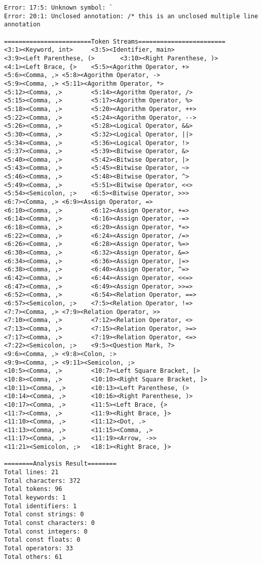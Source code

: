 \documentclass[lang=cn,11pt,a4paper]{paper}
\begin{document}
\begin{lstlisting}
Error: 17:5: Unknown symbol: `
Error: 20:1: Unclosed annotation: /* this is an unclosed multiple line annotation

========================Token Streams========================
<3:1><Keyword, int>     <3:5><Identifier, main>
<3:9><Left Parenthese, (>       <3:10><Right Parenthese, )>
<4:1><Left Brace, {>    <5:5><Agorithm Operator, +>
<5:6><Comma, ,> <5:8><Agorithm Operator, ->
<5:9><Comma, ,> <5:11><Agorithm Operator, *>
<5:12><Comma, ,>        <5:14><Agorithm Operator, />
<5:15><Comma, ,>        <5:17><Agorithm Operator, %>
<5:18><Comma, ,>        <5:20><Agorithm Operator, ++>
<5:22><Comma, ,>        <5:24><Agorithm Operator, -->
<5:26><Comma, ,>        <5:28><Logical Operator, &&>
<5:30><Comma, ,>        <5:32><Logical Operator, ||>
<5:34><Comma, ,>        <5:36><Logical Operator, !>
<5:37><Comma, ,>        <5:39><Bitwise Operator, &>
<5:40><Comma, ,>        <5:42><Bitwise Operator, |>
<5:43><Comma, ,>        <5:45><Bitwise Operator, ~>
<5:46><Comma, ,>        <5:48><Bitwise Operator, ^>
<5:49><Comma, ,>        <5:51><Bitwise Operator, <<>
<5:54><Semicolon, ;>    <6:5><Bitwise Operator, >>>
<6:7><Comma, ,> <6:9><Assign Operator, =>
<6:10><Comma, ,>        <6:12><Assign Operator, +=>
<6:14><Comma, ,>        <6:16><Assign Operator, -=>
<6:18><Comma, ,>        <6:20><Assign Operator, *=>
<6:22><Comma, ,>        <6:24><Assign Operator, /=>
<6:26><Comma, ,>        <6:28><Assign Operator, %=>
<6:30><Comma, ,>        <6:32><Assign Operator, &=>
<6:34><Comma, ,>        <6:36><Assign Operator, |=>
<6:38><Comma, ,>        <6:40><Assign Operator, ^=>
<6:42><Comma, ,>        <6:44><Assign Operator, <<=>
<6:47><Comma, ,>        <6:49><Assign Operator, >>=>
<6:52><Comma, ,>        <6:54><Relation Operator, ==>
<6:57><Semicolon, ;>    <7:5><Relation Operator, !=>
<7:7><Comma, ,> <7:9><Relation Operator, >>
<7:10><Comma, ,>        <7:12><Relation Operator, <>
<7:13><Comma, ,>        <7:15><Relation Operator, >=>
<7:17><Comma, ,>        <7:19><Relation Operator, <=>
<7:22><Semicolon, ;>    <9:5><Question Mark, ?>
<9:6><Comma, ,> <9:8><Colon, :>
<9:9><Comma, ,> <9:11><Semicolon, ;>
<10:5><Comma, ,>        <10:7><Left Square Bracket, [>
<10:8><Comma, ,>        <10:10><Right Square Bracket, ]>
<10:11><Comma, ,>       <10:13><Left Parenthese, (>
<10:14><Comma, ,>       <10:16><Right Parenthese, )>
<10:17><Comma, ,>       <11:5><Left Brace, {>
<11:7><Comma, ,>        <11:9><Right Brace, }>
<11:10><Comma, ,>       <11:12><Dot, .>
<11:13><Comma, ,>       <11:15><Comma, ,>
<11:17><Comma, ,>       <11:19><Arrow, ->>
<11:21><Semicolon, ;>   <18:1><Right Brace, }>

========Analysis Result========
Total lines: 21
Total characters: 372
Total tokens: 96
Total keywords: 1
Total identifiers: 1
Total const strings: 0
Total const characters: 0
Total const integers: 0
Total const floats: 0
Total operators: 33
Total others: 61
\end{lstlisting}
\end{document}
